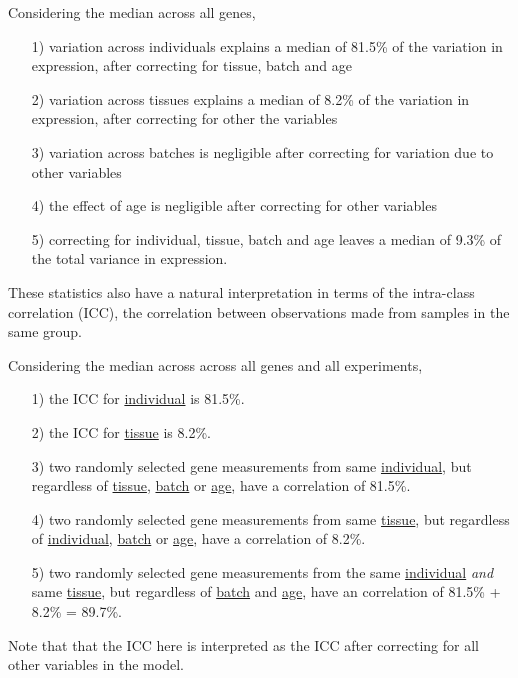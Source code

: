 \documentclass[12pt]{article}\usepackage[]{graphicx}\usepackage[]{xcolor}
\begin{document}
Considering the median across all genes,
\begin{itemize}
\item[1)] variation across individuals explains a median of 81.5\% of the variation in expression, after correcting for tissue, batch and age
\item[2)] variation across tissues explains a median of 8.2\% of the variation in expression, after correcting for other the variables
\item[3)] variation across batches is negligible after correcting for variation due to other variables
\item[4)] the effect of age is negligible after correcting for other variables 
\item[5)] correcting for individual, tissue, batch and age leaves a median of 9.3\% of the total variance in expression.
\end{itemize} 

These statistics also have a natural interpretation in terms of the intra-class correlation (ICC), the correlation between observations made from samples in the same group.  

Considering the median across across all genes and all experiments,
\begin{itemize}
\item[1)] the ICC for \underline{individual} is 81.5\%.
\item[2)] the ICC for \underline{tissue} is 8.2\%.
\item[3)] two randomly selected gene measurements from same \underline{individual}, but regardless of \underline{tissue}, \underline{batch} or \underline{age}, have a correlation of 81.5\%. 
\item[4)] two randomly selected gene measurements from same \underline{tissue}, but regardless of \underline{individual}, \underline{batch} or \underline{age}, have a correlation of 8.2\%.
\item[5)] two randomly selected gene measurements from the same \underline{individual} {\it and} same \underline{tissue}, but regardless of \underline{batch} and \underline{age}, have an correlation of 81.5\% + 8.2\% = 89.7\%.
\end{itemize} 

Note that that the ICC here is interpreted as the ICC after correcting for all other variables in the model.
\end{document}
